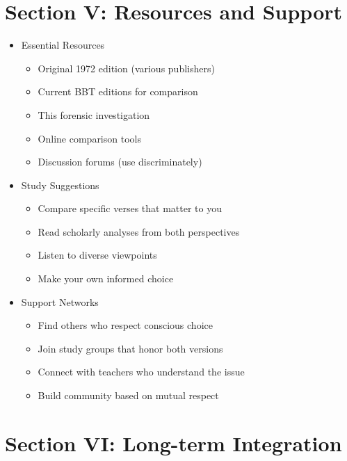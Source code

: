 \documentclass[11pt,twoside]{book}
\begin{document}
\section*{Section V: Resources and Support}
\label{sec:orgd5104a2}

\begin{itemize}
\item Essential Resources
\label{sec:orgdec4769}
\begin{itemize}
\item Original 1972 edition (various publishers)
\item Current BBT editions for comparison
\item This forensic investigation
\item Online comparison tools
\item Discussion forums (use discriminately)
\end{itemize}
\item Study Suggestions
\label{sec:org08f306c}
\begin{itemize}
\item Compare specific verses that matter to you
\item Read scholarly analyses from both perspectives
\item Listen to diverse viewpoints
\item Make your own informed choice
\end{itemize}
\item Support Networks
\label{sec:org6a398ba}
\begin{itemize}
\item Find others who respect conscious choice
\item Join study groups that honor both versions
\item Connect with teachers who understand the issue
\item Build community based on mutual respect
\end{itemize}
\end{itemize}
\section*{Section VI: Long-term Integration}
\label{sec:org9665cec}
\end{document}
